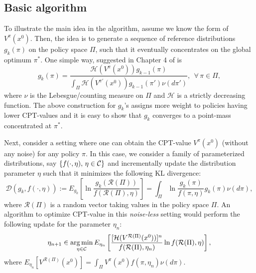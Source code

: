 \documentclass[11pt,letterpaper,english]{article}
\begin{document}
\subsection{Basic algorithm}
To illustrate the main idea in the algorithm, assume we know the form of $V^\pi(x^0)$. Then, the idea is to generate a sequence of reference distributions $g_k(\pi)$ on the policy space $\Pi$, such that it eventually concentrates on the global optimum $\pi^*$. One simple way, suggested in Chapter 4 of \cite{chang2013simulation} is
\begin{equation}
\label{eqn:naive}
g_{k}(\pi)=
\frac{\mathcal{H}(V^\pi(x^0))g_{k-1}(\pi)}
{\int_{\Pi}\mathcal{H}(V^{\pi'}(x^0))g_{k-1}(\pi')\nu(d\pi')},
~~\forall\, \pi \in \Pi,
\end{equation}
where $\nu$ is the Lebesgue/counting measure on $\Pi$ and $\mathcal{H}$ is a strictly decreasing function. The above construction for $g_k$'s assigns more weight to policies having lower CPT-values and it is easy to show that $g_k$ converges to a point-mass concentrated at $\pi^*$.

Next, consider a setting where one can obtain the CPT-value $V^\pi(x^0)$ (without any noise) for any policy $\pi$. In this case, we consider a family of parameterized distributions, say $\{f(\cdot,\eta),\,\eta\in \mathcal{C} \}$ and incrementally update the distribution parameter $\eta$ such that it minimizes the following KL divergence:
\begin{equation}\label{eqn:kl}
\mathcal{D}(g_k,f(\cdot,\eta)):=E_{g_k}\left[\ln \frac{g_{k}(\mathcal{R}(\Pi))}{f(\mathcal{R}(\Pi),\eta)}\right]=\int_{\Pi} \ln \frac{g_{k}(\pi)}{f(\pi,\eta)}g_{k}(\pi)\nu(d\pi), \nonumber
\end{equation}
where $\mathcal{R}(\Pi)$ is a random vector taking values in the policy space $\Pi$. 
An algorithm to optimize CPT-value in this \textit{noise-less} setting would perform the following update for the parameter $\eta_n$:
\begin{equation}
\label{eqn:interior}
\eta_{n+1} \in \mathop{\rm arg\,min}_{\eta \in \mathcal{C}}
E_{\eta_n}\left[\frac{[\mathcal{H}(V^{\mathcal{R}(\Pi)}(x^0))]^{n}}
{f(\mathcal{R}(\Pi),\eta_{n})}
\ln f(\mathcal{R}(\Pi),\eta)\right],
\end{equation}
where $E_{\eta_n}[V^{\mathcal{R}(\Pi)}(x^0)]=\int_{\Pi} V^{\pi}(x^0)f(\pi,\eta_n)\nu(d\pi).$
\end{document}
